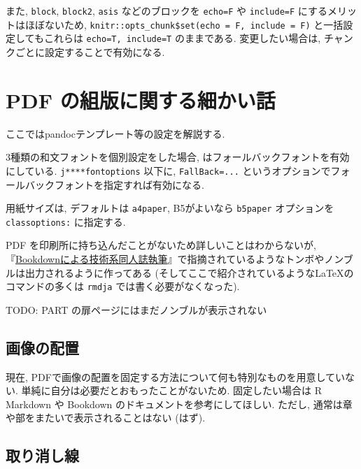 \documentclass[
  nomag]{bxjsbook}
\theoremstyle{definition}
\theoremstyle{definition}
\theoremstyle{definition}
\theoremstyle{remark}
\begin{document}
また, \texttt{block}, \texttt{block2}, \texttt{asis} などのブロックを
\texttt{echo=F} や \texttt{include=F} にするメリットはほぼないため,
\texttt{knitr::opts\_chunk\$set(echo\ =\ F,\ include\ =\ F)}
と一括設定してもこれらは \texttt{echo=T,\ include=T} のままである.
変更したい場合は, チャンクごとに設定することで有効になる.

\hypertarget{pdf-ux306eux7d44ux7248ux306bux95a2ux3059ux308bux7d30ux304bux3044ux8a71}{%
\chapter{PDF
の組版に関する細かい話}\label{pdf-ux306eux7d44ux7248ux306bux95a2ux3059ux308bux7d30ux304bux3044ux8a71}}

ここではpandocテンプレート等の設定を解説する.

3種類の和文フォントを個別設定をした場合, \XeLaTeX
はフォールバックフォントを有効にしている. \texttt{j****fontoptions}
以下に, \texttt{FallBack=...}
というオプションでフォールバックフォントを指定すれば有効になる.

用紙サイズは, デフォルトは \texttt{a4paper}, B5がよいなら
\texttt{b5paper} オプションを \texttt{classoptions:} に指定する.

PDF を印刷所に持ち込んだことがないため詳しいことはわからないが,
『\href{https://teastat.blogspot.com/2019/01/bookdown.html}{Bookdownによる技術系同人誌執筆}』で指摘されているようなトンボやノンブルは出力されるように作ってある
(そしてここで紹介されているようなLaTeXのコマンドの多くは \texttt{rmdja}
では書く必要がなくなった).

TODO: PART の扉ページにはまだノンブルが表示されない

\hypertarget{ux753bux50cfux306eux914dux7f6e}{%
\section{画像の配置}\label{ux753bux50cfux306eux914dux7f6e}}

現在,
PDFで画像の配置を固定する方法について何も特別なものを用意していない.
単純に自分は必要だとおもったことがないため. 固定したい場合は R Markdown
や Bookdown のドキュメントを参考にしてほしい. ただし,
通常は章や部をまたいで表示されることはない (はず).

\hypertarget{ux53d6ux308aux6d88ux3057ux7dda}{%
\section{取り消し線}\label{ux53d6ux308aux6d88ux3057ux7dda}}
\end{document}
